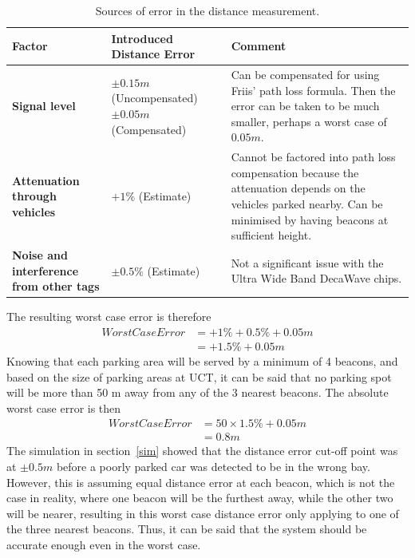 \begin{table}[H]
\centering
\begin{tabular}{|p{3cm}|p{3cm}|p{5cm}|}
\hline
\textbf{Factor}                        & \multicolumn{1}{l|}{\textbf{Introduced Distance Error}} & \multicolumn{1}{l|}{\textbf{Comment}}                                                                                                                                  \\ \hline
\textbf{Signal level}                  & $\pm 0.15 m$ \newline (Uncompensated) $\pm 0.05 m$ \newline (Compensated)            & Can be compensated for using Friis’ path loss formula.\cite{2} Then the error can be taken to be much smaller, perhaps a worst case of $0.05 m$.                          \\ \hline
\textbf{Attenuation through vehicles}  & $+1 \%$ (Estimate)                                        & Cannot be factored into path loss compensation because the attenuation depends on the vehicles parked nearby. Can be minimised by having beacons at sufficient height. \\ \hline
\textbf{Noise and interference from other tags} & $\pm 0.5 \%$ \newline (Estimate)                                      & Not a significant issue with the Ultra Wide Band DecaWave chips.\cite{gaffney}                                                                                               \\ \hline
\end{tabular}
\caption{Sources of error in the distance measurement.}
\label{tbl:dst-error}
\end{table}

The resulting worst case error is therefore
\begin{equation*}
\begin{split}
Worst Case Error &= +1\% + 0.5\% + 0.05 m \\
&= +1.5\% + 0.05 m
\end{split}
\end{equation*}
Knowing that each parking area will be served by a minimum of 4 beacons, and based on the size of
parking areas at UCT, it can be said that no parking spot will be more than 50 m away from any of the 3
nearest beacons. The absolute worst case error is then
\begin{equation*}
\begin{split}
Worst Case Error &= 50 \times 1.5\% + 0.05 m \\
&= 0.8 m
\end{split}
\end{equation*}
The simulation in section~\ref{sim} showed that the distance error cut-off point was at $\pm 0.5m$ before a
poorly parked car was detected to be in the wrong bay. However, this is assuming equal distance error
at each beacon, which is not the case in reality, where one beacon will be the furthest away, while the other two will be nearer, resulting in this worst case distance error only applying to one of the three
nearest beacons. Thus, it can be said that the system should be accurate enough even in the worst case.

